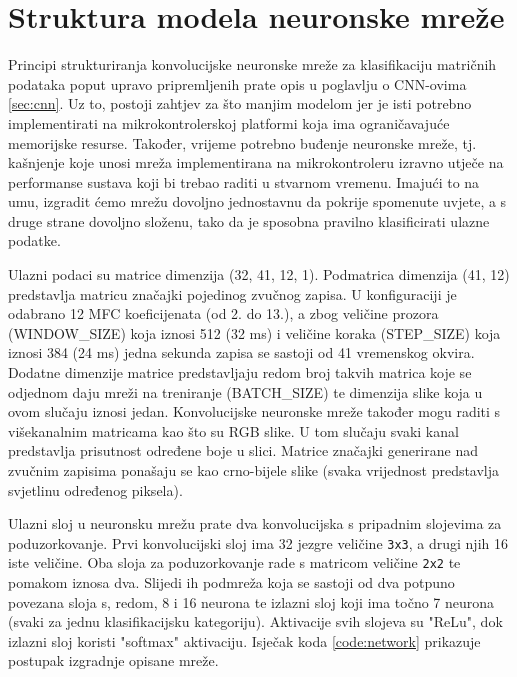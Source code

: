 \section{Struktura modela neuronske mreže}

Principi strukturiranja konvolucijske neuronske mreže za klasifikaciju matričnih podataka
poput upravo pripremljenih prate opis u poglavlju o CNN-ovima \ref{sec:cnn}.
Uz to, postoji zahtjev za što manjim modelom jer je isti potrebno implementirati na 
mikrokontrolerskoj platformi koja ima ograničavajuće memorijske resurse. Također,
vrijeme potrebno buđenje neuronske mreže, tj. kašnjenje koje unosi mreža
implementirana na mikrokontroleru izravno utječe na performanse sustava 
koji bi trebao raditi u stvarnom vremenu. Imajući to na umu, izgradit ćemo
mrežu dovoljno jednostavnu da pokrije spomenute uvjete, a s druge strane dovoljno
složenu, tako da je sposobna pravilno klasificirati ulazne podatke.

Ulazni podaci su matrice dimenzija (32, 41, 12, 1). Podmatrica dimenzija (41, 12) 
predstavlja matricu značajki pojedinog zvučnog zapisa. U konfiguraciji je odabrano 
12 MFC koeficijenata (od 2. do 13.), a zbog veličine prozora (WINDOW\_SIZE) 
koja iznosi 512 (32 ms) i veličine koraka (STEP\_SIZE) koja iznosi 384 (24 ms)
jedna sekunda zapisa se sastoji od 41 vremenskog okvira. Dodatne dimenzije matrice
predstavljaju redom broj takvih matrica koje se odjednom daju mreži na treniranje 
(BATCH\_SIZE) te dimenzija slike koja u ovom slučaju iznosi jedan. Konvolucijske
neuronske mreže također mogu raditi s višekanalnim matricama kao što su RGB slike. U tom 
slučaju svaki kanal predstavlja prisutnost određene boje u slici. Matrice značajki
generirane nad zvučnim zapisima ponašaju se kao crno-bijele slike (svaka vrijednost
predstavlja svjetlinu određenog piksela).

Ulazni sloj u neuronsku mrežu prate dva konvolucijska s pripadnim slojevima za
poduzorkovanje. Prvi konvolucijski sloj ima 32 jezgre veličine \texttt{3x3},
a drugi njih 16 iste veličine. Oba sloja za poduzorkovanje rade s matricom
veličine \texttt{2x2} te pomakom iznosa dva. Slijedi ih podmreža koja se sastoji 
od dva potpuno povezana sloja 
s, redom, 8 i 16 neurona te izlazni sloj koji ima točno 7 neurona (svaki za jednu
klasifikacijsku kategoriju). Aktivacije svih slojeva su "ReLu", dok izlazni sloj
koristi "softmax" aktivaciju. Isječak koda \ref{code:network} prikazuje postupak
izgradnje opisane mreže.

